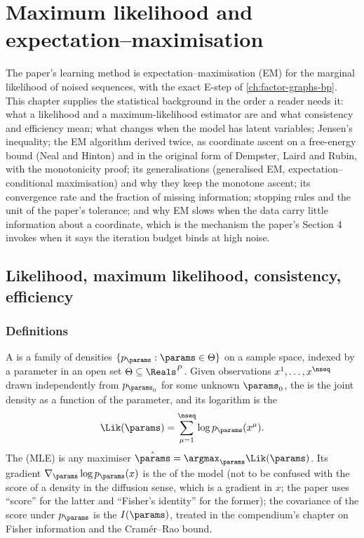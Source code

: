 \chapter{Maximum likelihood and expectation--maximisation}
\label{ch:maximum-likelihood-em}

The paper's learning method is expectation--maximisation (EM) for the marginal
likelihood of noised sequences, with the exact E-step of \cref{ch:factor-graphs-bp}.
This chapter supplies the statistical background in the order a reader needs it: what a
likelihood and a maximum-likelihood estimator are and what consistency and efficiency
mean; what changes when the model has latent variables; Jensen's inequality; the EM
algorithm derived twice, as coordinate ascent on a free-energy bound (Neal and Hinton)
and in the original form of Dempster, Laird and Rubin, with the monotonicity proof;
its generalisations (generalised EM, expectation--conditional maximisation) and why
they keep the monotone ascent; its convergence rate and the fraction of missing
information; stopping rules and the unit of the paper's tolerance; and why EM slows
when the data carry little information about a coordinate, which is the mechanism the
paper's Section 4 invokes when it says the iteration budget binds at high noise.

\section{Likelihood, maximum likelihood, consistency, efficiency}

\subsection{Definitions}

A  is a family of densities $\{p_\params:\params\in\Theta\}$ on a
sample space, indexed by a parameter in an open set $\Theta\subseteq\Reals^P$. Given
observations $x^1,\dots,x^\nseq$ drawn independently from $p_{\params_0}$ for some
unknown  $\params_0$, the  is the joint density as
a function of the parameter, and its logarithm is the 
\begin{equation}
  \Lik(\params)=\sum_{\mu=1}^{\nseq}\log p_\params(x^\mu).
  \label{eq:ml-loglik}
\end{equation}
The  (MLE) is any maximiser
$\hat\params=\argmax_\params\Lik(\params)$. Its gradient $\nabla_\params\log p_\params(x)$
is the  of the model (not to be confused with the score of a density in the
diffusion sense, which is a gradient in $x$; the paper uses ``score'' for the latter and
``Fisher's identity'' for the former); the covariance of the score under $p_\params$ is
the  $I(\params)$, treated in the compendium's chapter on Fisher
information and the Cram\'er--Rao bound.

